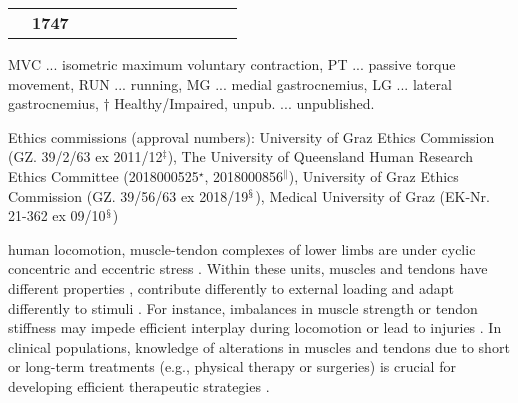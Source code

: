 \documentclass[journal,twoside,web]{ieeecolor}
\begin{document}
\begin{table*}[ht!]
\begin{center}
\begin{tabular}{cccccccccccc}
        &\textbf{\small 1747}\\
    \end{tabular}
    \end{center}
    \begin{tablenotes}
        \item MVC ... isometric maximum voluntary contraction, PT ... passive torque movement, RUN ... running, MG ... medial gastrocnemius, LG ... lateral gastrocnemius, $\dagger$ Healthy/Impaired, unpub. ... unpublished.
        \item Ethics commissions (approval numbers): University of Graz Ethics Commission (GZ. 39/2/63 ex 2011/12$^{\ddagger}$), The University of Queensland Human Research Ethics Committee (2018000525$^\star$, 2018000856$^\|$), University of Graz Ethics Commission (GZ. 39/56/63 ex 2018/19$^\mathsection$), Medical University of Graz (EK-Nr. 21-362 ex 09/10$^\mathsection$)
    \end{tablenotes}
    \vspace{-0.3cm}
\end{table*}
%
  human locomotion, muscle-tendon complexes of lower limbs are under cyclic concentric and eccentric stress \cite{j:Komi2000}. Within these units, muscles and tendons have different properties \cite{j:Alexander1991}, contribute differently to external loading \cite{j:Lichtwark2006} and adapt differently to stimuli \cite{j:Magnusson2008}. For instance, imbalances in muscle strength or tendon stiffness may impede efficient interplay during locomotion \cite{j:Roberts1997} or lead to injuries \cite{j:Arampatzis2020}. In clinical populations, knowledge of alterations in muscles and tendons due to short or long-term treatments (e.g., physical therapy or surgeries) is crucial for developing efficient therapeutic strategies \cite{j:Hoesl2020}.
\end{document}
